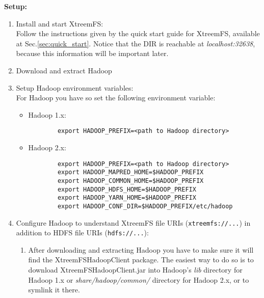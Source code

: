 \documentclass[a4paper,10pt]{book}
\begin{document}
\textbf{Setup:}
\begin{enumerate}
\item Install and start XtreemFS:\\
	Follow the instructions given by the quick start guide for XtreemFS, available at Sec.\ref{sec:quick_start}. Notice
	that the DIR is reachable at \textit{localhost:32638}, because this information will be important later.

\item Download and extract Hadoop

\item Setup Hadoop environment variables:\\
For Hadoop you have so set the following environment variable:
   \begin{itemize}
   \item Hadoop 1.x:
      \begin{verbatim}
		export HADOOP_PREFIX=<path to Hadoop directory>
      \end{verbatim}

   \item Hadoop 2.x:
      \begin{verbatim}
		export HADOOP_PREFIX=<path to Hadoop directory>
		export HADOOP_MAPRED_HOME=$HADOOP_PREFIX
		export HADOOP_COMMON_HOME=$HADOOP_PREFIX
		export HADOOP_HDFS_HOME=$HADOOP_PREFIX
		export HADOOP_YARN_HOME=$HADOOP_PREFIX
		export HADOOP_CONF_DIR=$HADOOP_PREFIX/etc/hadoop
      \end{verbatim}
   \end{itemize}

\item Configure Hadoop to understand XtreemFS file URIs (\texttt{xtreemfs://...}) in addition to HDFS file URIs (\texttt{hdfs://...}):
	\begin{enumerate}
	\item After downloading and extracting Hadoop you have to make sure it will find the XtreemFSHadoopClient package.
	The easiest way to do so is to download XtreemFSHadoopClient.jar into Hadoop's \textit{lib} directory for Hadoop 1.x or \textit{share/hadoop/common/} directory for Hadoop 2.x, or to symlink it there.


\end{enumerate}
\end{enumerate}
\end{document}
